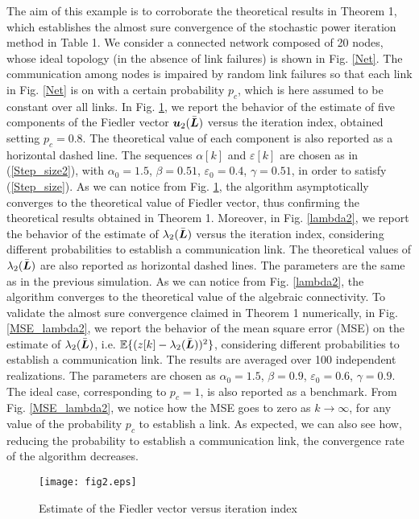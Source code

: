 \documentclass[10pt,twocolumn]{IEEEtran}
\def\bL{\mbox{\boldmath $L$}}
\def\bu{\mbox{\boldmath $u$}}
\begin{document}
 The aim of this example is to corroborate the theoretical results in Theorem 1, which establishes the almost sure convergence of the stochastic power iteration method in Table 1. We consider a connected network composed of 20 nodes, whose ideal topology (in the absence of link failures) is shown in Fig. \ref{Net}. The communication among nodes is impaired by random link failures so that each link in Fig. \ref{Net} is on with a certain probability $p_c$, which is here assumed to be constant over all links.
In Fig. \ref{Fiedler}, we report the behavior of the estimate of five components of the Fiedler vector  $\bu_2(\bar{\bL})$ versus the iteration index, obtained setting $p_c=0.8$. The theoretical value of each component is also reported as a horizontal dashed line. The sequences $\alpha[k]$ and $\varepsilon[k]$ are chosen as in (\ref{Step_size2}), with $\alpha_0=1.5$, $\beta=0.51$, $\varepsilon_0=0.4$, $\gamma=0.51$, in order to satisfy (\ref{Step_size}). As we can notice from Fig. \ref{Fiedler}, the algorithm asymptotically converges to the theoretical value of Fiedler vector, thus confirming the theoretical results obtained in Theorem 1.
Moreover, in Fig. \ref{lambda2}, we report the behavior of the estimate of $\lambda_2(\bar{\bL})$ versus the iteration index, considering different probabilities to establish a communication link. The theoretical values of $\lambda_2(\bar{\bL})$ are also reported as horizontal dashed lines. The parameters are the same as in the previous simulation. As we can notice from Fig. \ref{lambda2}, the algorithm converges to the theoretical value of the algebraic connectivity.
To validate the almost sure convergence claimed in Theorem 1 numerically, in Fig. \ref{MSE_lambda2}, we report the behavior of the mean square error (MSE) on the estimate of $\lambda_2(\bar{\bL})$, i.e. $\mathbb{E}\{(z[k]-\lambda_2(\bar{\bL}))^2\}$, considering different probabilities to establish a communication link. The results are averaged over 100 independent realizations. The parameters are chosen as $\alpha_0=1.5$, $\beta=0.9$, $\varepsilon_0=0.6$, $\gamma=0.9$. The ideal case, corresponding to $p_c=1$, is also reported as a benchmark. From Fig. \ref{MSE_lambda2}, we notice how the MSE goes to zero as $k\rightarrow\infty$, for any value of the probability $p_c$ to establish a link. As expected, we can also see how, reducing the probability to establish a communication link, the convergence rate of the algorithm decreases.

\begin{figure}[t]
\centering
\texttt{[image: fig2.eps]}
  \caption{Estimate of the Fiedler vector versus iteration index}\label{Fiedler}
\end{figure}
\end{document}
